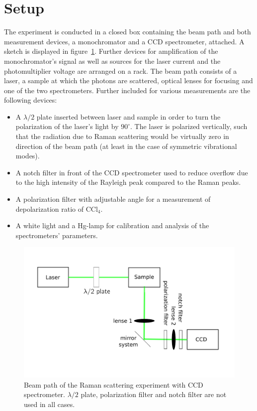 \section{Setup}
The experiment is conducted in a closed box containing the beam path and both measurement devices, a monochromator and a 
CCD spectrometer, attached. A sketch is displayed in figure~\ref{fig:setup}. 
Further devices for amplification of the monochromator's signal as well as sources for the 
laser current and the photomultiplier voltage are arranged on a rack. The beam path consists of a laser, a sample at which
the photons are scattered, optical lenses for focusing and one of the two spectrometers. Further included for various 
measurements are the following devices:
\begin{itemize}
    \item A $\lambda / 2$ plate inserted between laser and sample in order to turn the 
        polarization of the laser's light by $90^\circ$. The laser is polarized vertically, such that the radiation due to 
        Raman scattering would be virtually zero in direction of the beam path (at least in the case of symmetric
        vibrational modes).
    \item A notch filter in front of the CCD spectrometer used to reduce overflow due to the high intensity of the 
        Rayleigh peak compared to the Raman peaks. 
    \item A polarization filter with adjustable angle for a measurement of depolarization ratio of CCl$_4$. 
    \item A white light and a Hg-lamp for calibration and analysis of the spectrometers' parameters. 
\end{itemize}

\begin{figure}[htpb]
    \centering
    \includegraphics[width=0.8\linewidth]{figures/setup}
    \caption{
        Beam path of the Raman scattering experiment with CCD spectrometer. $\lambda / 2$ plate, polarization 
        filter and notch filter are not used in all cases.
        }
    \label{fig:setup}
\end{figure}

